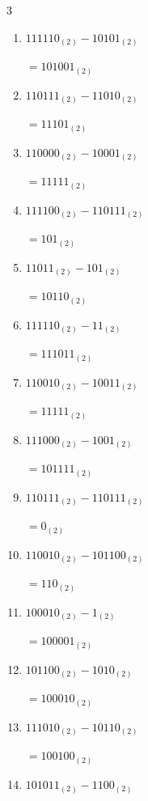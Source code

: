 \begin{multicols}{3}
\begin{enumerate}
        $=11_{(2)}$

  \item $111110_{(2)} - 10101_{(2)}$

        $=101001_{(2)}$

\columnbreak %

  \item $110111_{(2)} - 11010_{(2)}$

        $=11101_{(2)}$

  \item $110000_{(2)} - 10001_{(2)}$

        $=11111_{(2)}$

  \item $111100_{(2)} - 110111_{(2)}$

        $=101_{(2)}$

  \item $11011_{(2)} - 101_{(2)}$

        $=10110_{(2)}$

  \item $111110_{(2)} - 11_{(2)}$

        $=111011_{(2)}$

  \item $110010_{(2)} - 10011_{(2)}$

        $=11111_{(2)}$

  \item $111000_{(2)} - 1001_{(2)}$

        $=101111_{(2)}$

  \item $110111_{(2)} - 110111_{(2)}$

        $=0_{(2)}$

  \item $110010_{(2)} - 101100_{(2)}$

        $=110_{(2)}$

  \item $100010_{(2)} - 1_{(2)}$

        $=100001_{(2)}$

\columnbreak %

\resetques

  \item $101100_{(2)} - 1010_{(2)}$

        $=100010_{(2)}$

  \item $111010_{(2)} - 10110_{(2)}$

        $=100100_{(2)}$

  \item $101011_{(2)} - 1100_{(2)}$


\end{enumerate}
\end{multicols}
